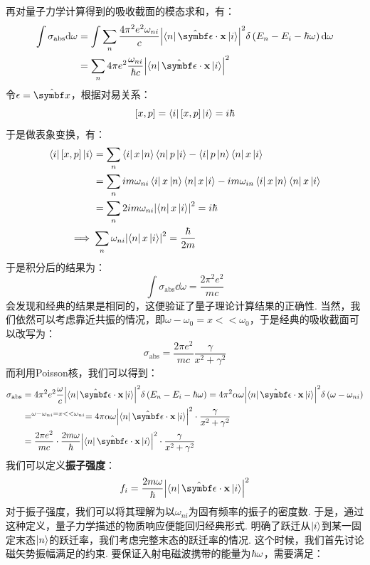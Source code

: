 再对量子力学计算得到的吸收截面的模态求和，有：
\begin{align*}
\int\sigma_{\mathrm{abs}}\dd\omega 
& = \int\sum_{n}\frac{4\pi^{2}e^{2}\omega_{ni}}{c}\abs{\bra{n}\uv{\epsilon}\cdot\vr\ket{i}}^{2}\delta\br{E_{n}-E_{i}-\hh\omega}\dd\omega \\
& = \sum_{n}4\pi e^{2}\frac{\omega_{ni}}{\hh c}\abs{\bra{n}\uv{\epsilon}\cdot\vr\ket{i}}^{2} \\
\end{align*}
令\(\epsilon=\uv{x}\)，根据对易关系：
\[
\left[{x,p}\right] = \bra{i}\left[{x,p}\right]\ket{i} = i\hbar
\]
于是做表象变换，有：
\begin{align*}
\bra{i}\mbr{x,p}\ket{i}
& = \sum_{n}\bra{i}x\ket{n}\bra{n}p\ket{i} - \bra{i}p\ket{n}\bra{n}x\ket{i} \\
& = \sum_{n}im\omega_{ni}\bra{i}x\ket{n}\bra{n}x\ket{i} - im\omega_{in}\bra{i}x\ket{n}\bra{n}x\ket{i} \\
& = \sum_{n}2im\omega_{ni}\abs{\bra{n}x\ket{i}}^{2} = i\hh \\
\Longrightarrow\ 
& \sum_{n}\omega_{ni}\abs{\bra{n}x\ket{i}}^{2} = \frac{\hh}{2m} 
\end{align*}
于是积分后的结果为：
\[
\int\sigma_{\mathrm{abs}}\dd\omega = \frac{2\pi^{2}e^{2}}{mc}
\]
会发现和经典的结果是相同的，这便验证了量子理论计算结果的正确性. 当然，我们依然可以考虑靠近共振的情况，即\(\omega-\omega_{0}=x<<\omega_{0}\)，于是经典的吸收截面可以改写为：
\[
\sigma_{\mathrm{abs}} = \frac{2\pi e^{2}}{mc}\frac{\gamma}{x^{2} + \gamma^{2}}
\]
而利用Poisson核，我们可以得到：
\begin{align*}
\sigma_{\mathrm{abs}} 
& = 4\pi^{2}e^{2}\frac{\omega}{c}\abs{\bra{n}\uv{\epsilon}\cdot\vr\ket{i}}^{2}\delta\br{E_{n}-E_{i}-\hh\omega} = 4\pi^{2}\al\omega\abs{\bra{n}\uv{\epsilon}\cdot\vr\ket{i}}^{2}\delta\br{\omega - \omega_{ni}} \\
& =^{\omega-\omega_{ni}=x<<\omega_{ni}}=4\pi\al\omega\abs{\bra{n}\uv{\epsilon}\cdot\vr\ket{i}}^{2}\cdot\frac{\gamma}{x^{2}+\gamma^{2}} \\
& = \frac{2\pi e^{2}}{mc} \cdot\frac{2m\omega}{\hh}\abs{\bra{n}\uv{\epsilon}\cdot\vr\ket{i}}^{2}\cdot\frac{\gamma}{x^{2}+\gamma^{2}}
\end{align*}
我们可以定义\textbf{振子强度}：
\[
f_{i} = \frac{2m\omega}{\hh}\abs{\bra{n}\uv{\epsilon}\cdot\vr\ket{i}}^{2}
\]
对于振子强度，我们可以将其理解为以\(\omega_{ni}\)为固有频率的振子的密度数. 于是，通过这种定义，量子力学描述的物质响应便能回归经典形式. 明确了跃迁从\(\ket{i}\)到某一固定末态\(\ket{n}\)的跃迁率，我们考虑完整末态的跃迁率的情况. 这个时候，我们首先讨论磁矢势振幅满足的约束. 要保证入射电磁波携带的能量为\(\hbar\omega\)，需要满足：
